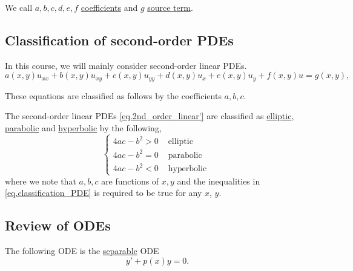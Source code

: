 \begin{definition}[]
    We call $a, b, c, d, e, f$ \underline{coefficients} and $g$ \underline{source term}. 
\end{definition}

\subsection{Classification of second-order PDEs}

In this course, we will mainly consider second-order linear PDEs.
\begin{equation}\label{eq.2nd_order_linear'}
    a(x, y) u_{x x}+b(x, y) u_{x y}+c(x, y) u_{y y}+d(x, y) u_x+e(x, y) u_y+f(x, y) u=g(x, y),
\end{equation}

These equations are classified as follows by the coefficients $a, b, c$.

\begin{definition} The second-order linear PDEs \eqref{eq.2nd_order_linear'} are classified as \underline{elliptic}, \underline{parabolic} and \underline{hyperbolic} by the following,
    \begin{equation}\label{eq.classification_PDE}
        \begin{cases}
            4 a c-b^2>0 & \text { elliptic } 
            \\ 
            4 a c-b^2=0 & \text { parabolic } 
            \\ 
            4 a c-b^2<0 & \text { hyperbolic }
        \end{cases}
    \end{equation}
where we note that $a, b, c$ are functions of $x, y$ and the inequalities in \eqref{eq.classification_PDE} is required to be true for any $x$, $y$.
\end{definition}


\subsection{Review of ODEs}

\begin{definition}
    The following ODE is the \underline{separable} ODE
    \begin{equation}\label{eq.separable}
        y' + p(x)y = 0.
    \end{equation}
\end{definition}

